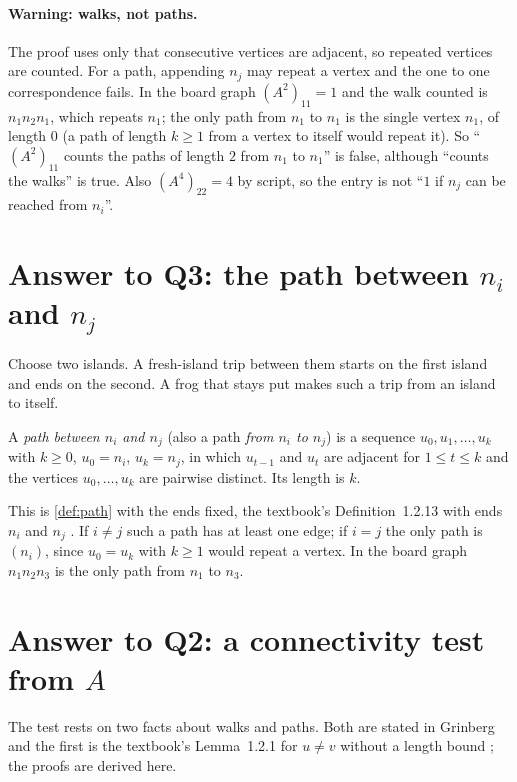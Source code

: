 \paragraph{Warning: walks, not paths.} The proof uses only that consecutive
vertices are adjacent, so repeated vertices are counted. For a path, appending
$n_j$ may repeat a vertex and the one to one correspondence fails. In the
board graph $(A^2)_{11}=1$ and the walk counted is $n_1n_2n_1$, which repeats
$n_1$; the only path from $n_1$ to $n_1$ is the single vertex $n_1$, of length
$0$ (a path of length $k\ge 1$ from a vertex to itself would repeat it). So
``$(A^2)_{11}$ counts the paths of length $2$ from $n_1$ to $n_1$'' is false,
although ``counts the walks'' is true. Also $(A^4)_{22}=4$ by script, so the entry is
not ``$1$ if $n_j$ can be reached from $n_i$''.

\section{Answer to Q3: the path between $n_i$ and $n_j$}\label{sec:q3}

\plainwords{} Choose two islands. A fresh-island trip between them starts on the first island and ends on the second. A frog that stays put makes such a trip from an island to itself.

\begin{definition}\label{def:pathbetween}
A \emph{path between $n_i$ and $n_j$} (also a path \emph{from $n_i$ to $n_j$})
is a sequence $u_0,u_1,\dots,u_k$ with $k\ge 0$, $u_0=n_i$, $u_k=n_j$, in
which $u_{t-1}$ and $u_t$ are adjacent for $1\le t\le k$ and the vertices
$u_0,\dots,u_k$ are pairwise distinct. Its length is $k$.
\end{definition}
This is \cref{def:path} with the ends fixed, the textbook's
Definition~1.2.13 with ends $n_i$ and $n_j$
\cite[p.~22]{petrosyan2015graphs}. If $i\ne j$ such a path has at least one
edge; if $i=j$ the only path is $(n_i)$, since $u_0=u_k$ with $k\ge 1$ would
repeat a vertex. In the board graph $n_1n_2n_3$ is the only path from $n_1$ to $n_3$.

\section{Answer to Q2: a connectivity test from $A$}\label{sec:q2}

The test rests on two facts about walks and paths. Both are stated in
Grinberg \cite[Corollary~2.9.7, p.~39; Section~2.9.4, p.~40]{grinberg2025graph}
and the first is the textbook's Lemma~1.2.1 for $u\ne v$ without a length
bound \cite[p.~23]{petrosyan2015graphs}; the proofs are derived here.

